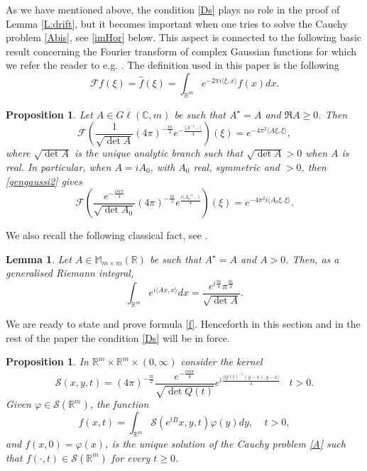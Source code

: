 \documentclass[11pt,a4paper]{amsart}
\def \vf{\varphi}
\newcommand{\Rm}{\mathbb R^m}
\numberwithin{equation}{section}
\newcommand{\sa}{\langle}
\newcommand{\da}{\rangle}
\newtheorem{lemma}[theorem]{Lemma}
\newtheorem{proposition}[theorem]{Proposition}
\numberwithin{equation}{section}
\begin{document}
As we have mentioned above, the condition \eqref{Ds} plays no role in the proof of Lemma \ref{L:drift}, but it becomes important when one tries to solve the Cauchy problem \eqref{Abis}, see \eqref{imHor} below. This aspect is connected to the following basic result concerning the Fourier transform of complex Gaussian functions for which we refer the reader to e.g. \cite[Theorem 7.6.1]{Hobook}. The definition used in this paper is the following
\[
\mathscr F f(\xi) = \hat f(\xi) = \int_{\Rm} e^{-2\pi i\sa \xi,x\da} f(x) dx.
\]

\begin{proposition}\label{P:ftgaussian}
Let $A\in G\ell(\mathbb C,m)$ be such that $A^\star = A$ and $\Re A \ge 0$. Then 
\begin{equation}\label{gengaussi2}
\mathscr F\left(\frac{1}{\sqrt{\operatorname{det} A}}(4\pi
)^{-\frac{m}{2}} e^{- \frac{\sa A^{-1}\cdot,\cdot\da}{4}}\right)(\xi) =
e^{- 4 \pi^2  \sa A\xi,\xi\da},
\end{equation}
where $\sqrt{\operatorname{det} A}$ is the unique analytic branch such that $\sqrt{\operatorname{det} A}>0$ when $A$ is real. In particular, when $A = i A_0$, with $A_0$ real, symmetric and $>0$, then \eqref{gengaussi2} gives
\begin{equation}\label{imgaussian}
\mathscr F\left(\frac{e^{-\frac{i m\pi}4}}{\sqrt{\operatorname{det} A_0}}(4\pi
)^{-\frac{m}{2}} e^{\frac{i \sa A_0^{-1}\cdot,\cdot\da}{4}}\right)(\xi) =
e^{- 4 \pi^2 i  \sa A_0\xi,\xi\da}.
\end{equation}
\end{proposition}

We also recall the following classical fact, see \cite[Section 3.4]{Hobook}.

\begin{lemma}\label{L:complexG}
Let $A\in \mathbb M_{m\times m}(\mathbb R)$ be such that $A^\star = A$ and $A > 0$. Then, as a generalised Riemann integral, 
\begin{equation}\label{iG}
\int_{\Rm} e^{i\langle A x,x\rangle} dx =
\frac{e^{i \frac m4} \pi^{\frac{m}{2}}}{\sqrt{\det A}}.
\end{equation}
\end{lemma}

We are ready to state and prove formula \eqref{f}. Henceforth in this section and in the rest of the paper the  condition \eqref{Ds} will be in force.

\begin{proposition}\label{P:erwin}
In $\Rm\times \Rm\times (0,\infty)$ consider the kernel
\begin{equation}\label{Skolmo}
\mathcal S(x,y,t) = 
(4\pi
)^{-\frac{m}{2}} \frac{e^{-\frac{i m\pi}4}}{\sqrt{\det Q(t)}}   e^{i \frac{\sa Q(t)^{-1}(y-x),y-x\da}{4}}\ \ \ \ t>0.
\end{equation}
Given $\vf\in \mathscr S(\Rm)$, the function
\begin{equation}\label{reallyfinal}
f(x,t) = 
\int_{\Rm} \mathcal S(e^{t B} x,y,t) \vf(y) dy,\ \ \ \ \ t>0,
\end{equation}
and $f(x,0) = \vf(x)$, 
is the unique solution of the Cauchy problem \eqref{A} such that $f(\cdot,t)\in \mathscr S(\Rm)$ for every $t\ge 0$.
\end{proposition}
\end{document}
